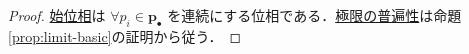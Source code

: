\documentclass[geometry_main]{subfiles}
\begin{document}
\begin{proof}
	\hyperref[def:initial-topo]{始位相}は $\forall p_i \in \bm{p}_\bullet$ を連続にする位相である．\hyperref[cmtd:univ-limit]{極限の普遍性}は命題\ref{prop:limit-basic}の証明から従う．
\end{proof}





\end{document}
